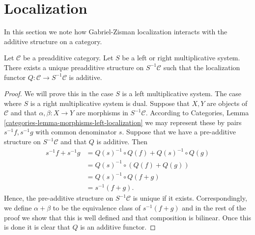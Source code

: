 \section{Localization}
\label{section-localization}

\noindent
In this section we note how Gabriel-Zisman localization interacts with
the additive structure on a category.

\begin{lemma}
\label{lemma-localization-preadditive}
Let $\mathcal{C}$ be a preadditive category.
Let $S$ be a left or right multiplicative system.
There exists a unique preadditive structure on
$S^{-1}\mathcal{C}$ such that the localization functor
$Q : \mathcal{C} \to S^{-1}\mathcal{C}$ is additive.
\end{lemma}

\begin{proof}
We will prove this in the case $S$ is a left multiplicative system.
The case where $S$ is a right multiplicative system is dual.
Suppose that $X, Y$ are objects of $\mathcal{C}$ and that
$\alpha, \beta : X \to Y$ are morphisms in $S^{-1}\mathcal{C}$. According to
Categories, Lemma \ref{categories-lemma-morphisms-left-localization}
we may represent these by pairs $s^{-1}f, s^{-1}g$ with common denominator $s$.
Suppose that we have a pre-additive structure on $S^{-1}\mathcal{C}$ and
that $Q$ is additive. Then
\begin{align*}
s^{-1}f+s^{-1}g
&=Q(s)^{-1}\circ Q(f)+Q(s)^{-1}\circ Q(g)\\
&=Q(s)^{-1}\circ(Q(f)+Q(g))\\
&=Q(s)^{-1}\circ Q(f+g)\\
&=s^{-1}(f+g).
\end{align*}
Hence, the pre-additive structure on $S^{-1}\mathcal{C}$ is unique if it
exists. Correspondingly, we define $\alpha + \beta$ to be the
equivalence class of $s^{-1}(f + g)$ and in the rest of the proof we show
that this is well defined and that composition is bilinear.
Once this is done it is clear that $Q$ is an additive functor.


\end{proof}
